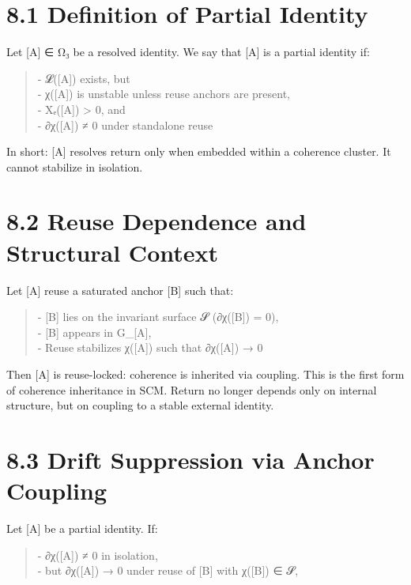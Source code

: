 \section{8.1 \textbar{} Definition of Partial
Identity}\label{definition-of-partial-identity}

Let {[}A{]} ∈ Ω₃ be a resolved identity. We say that {[}A{]} is a
partial identity if:

\begin{quote}
- 𝓛({[}A{]}) exists, but\\
- χ({[}A{]}) is unstable unless reuse anchors are present,\\
- Xₑ({[}A{]}) \textgreater{} 0, and\\
- ∂χ({[}A{]}) ≠ 0 under standalone reuse
\end{quote}

In short: {[}A{]} resolves return only when embedded within a coherence
cluster. It cannot stabilize in isolation.

\section{8.2 \textbar{} Reuse Dependence and Structural
Context}\label{reuse-dependence-and-structural-context}

Let {[}A{]} reuse a saturated anchor {[}B{]} such that:

\begin{quote}
- {[}B{]} lies on the invariant surface 𝓢 (∂χ({[}B{]}) = 0),\\
- {[}B{]} appears in G\_{[}A{]},\\
- Reuse stabilizes χ({[}A{]}) such that ∂χ({[}A{]}) → 0
\end{quote}

Then {[}A{]} is reuse-locked: coherence is inherited via coupling. This
is the first form of coherence inheritance in SCM. Return no longer
depends only on internal structure, but on coupling to a stable external
identity.

\section{8.3 \textbar{} Drift Suppression via Anchor
Coupling}\label{drift-suppression-via-anchor-coupling}

Let {[}A{]} be a partial identity. If:

\begin{quote}
- ∂χ({[}A{]}) ≠ 0 in isolation,\\
- but ∂χ({[}A{]}) → 0 under reuse of {[}B{]} with χ({[}B{]}) ∈ 𝓢,
\end{quote}

